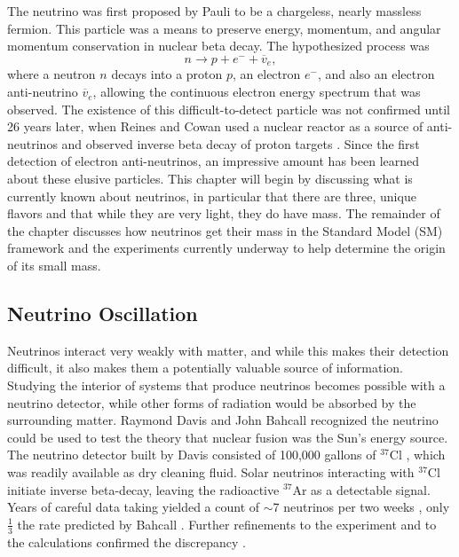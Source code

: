 The neutrino was first proposed by Pauli \cite{Pauli} to be a chargeless, nearly massless fermion.  This particle was a means to preserve energy, momentum, and angular momentum conservation in nuclear beta decay.  The hypothesized process was
\begin{equation}
n \rightarrow p + e^- + \overline{v}_e,
\end{equation}
where a neutron $n$ decays into a proton $p$, an electron $e^-$, and also an electron anti-neutrino $\overline{v}_e$, allowing the continuous electron energy spectrum that was observed. The existence of this difficult-to-detect particle was not confirmed until 26 years later, when Reines and Cowan used a nuclear reactor as a source of anti-neutrinos and observed inverse beta decay of proton targets \cite{poltergeist}.  Since the first detection of electron anti-neutrinos, an impressive amount has been learned about these elusive particles.  This chapter will begin by discussing what is currently known about neutrinos, in particular that there are three, unique flavors and that while they are very light, they do have mass.  The remainder of the chapter discusses how neutrinos get their mass in the Standard Model (SM) framework and the experiments currently underway to help determine the origin of its small mass.

\subsection{Neutrino Oscillation}
Neutrinos interact very weakly with matter, and while this makes their detection difficult, it also makes them a potentially valuable source of information.  Studying the interior of systems that produce neutrinos becomes possible with a neutrino detector, while other forms of radiation would be absorbed by the surrounding matter.  Raymond Davis and John Bahcall recognized the neutrino could be used to test the theory that nuclear fusion was the Sun's energy source.  The neutrino detector built by Davis consisted of 100,000 gallons of $^{37}$Cl \cite{DavisInitial}, which was readily available as dry cleaning fluid.  Solar neutrinos interacting with $^{37}$Cl initiate inverse beta-decay, leaving the radioactive $^{37}$Ar as a detectable signal.  Years of careful data taking yielded a count of $\sim$7 neutrinos per two weeks \cite{DavisInitial}, only $\frac{1}{3}$ the rate predicted by Bahcall \cite{BahcallSun}.  Further refinements to the experiment and to the calculations confirmed the discrepancy \cite{Davis}.

